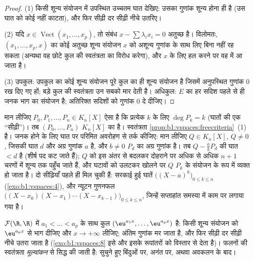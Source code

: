 \begin{proof}
(1) किसी शून्य संयोजन में उपस्थित उच्चतम घात देखिए: उसका गुणांक शून्य होना
ही है (उस घात को कोई नहीं काटता), और फिर सीढ़ी दर सीढ़ी नीचे उतरिए।

(2) यदि $x \in \operatorname{Vect}(x_1, \dots, x_p)$, तो संबंध $x -
\sum\lambda_i x_i = 0$ अतुच्छ है। विलोमतः, $(x_1, \dots, x_p, x)$ का कोई
अतुच्छ शून्य संयोजन $x$ को अशून्य गुणांक के साथ लिए बिना नहीं रह सकता
(अन्यथा वह छोटे कुल की स्वतंत्रता का विरोध करेगा), और $x$ के लिए हल करने पर
वह  में आ जाता है।

(3) उपकुल: उपकुल का कोई शून्य संयोजन पूरे कुल का ही शून्य संयोजन है जिसमें
अनुपस्थित गुणांक $0$ रख दिए गए हों; बड़े कुल की स्वतंत्रता उन सबको मार देती
है। अधिकुल: $E$ का हर सदिश पहले से ही जनक भाग का संयोजन है; अतिरिक्त सदिशों
को गुणांक $0$ दे दीजिए।
\end{proof}

\begin{example}[सीढ़ी सिद्धांत]
\label{ex:b1:vspaces:staircase}
मान लीजिए $P_0, P_1, \dots, P_n \in K_n[X]$ ऐसा है कि प्रत्येक $k$ के लिए
$\deg P_k = k$ (घातों की एक ``सीढ़ी'')। तब $(P_0, \dots, P_n)$ $K_n[X]$ का
 है। स्वतंत्रता \cref{prop:b1:vspaces:freecriteria}~(1) है। जनक होने के
लिए घात पर परिमित अवरोहण से तर्क कीजिए: मान लीजिए $Q \in K_n[X]$, $Q \neq
0$, जिसकी घात $d$ और अग्र गुणांक $a$ है, और $b \neq 0$ $P_d$ का अग्र गुणांक
है। तब $Q - \frac ab P_d$ की घात $< d$ है (शीर्ष पद कट जाते हैं); $Q$ को इस
अंतर से बदलकर दोहराने पर अधिक से अधिक $n + 1$ चरणों में शून्य  तक पहुँच
जाते हैं, और घटावों को उलटकर खोलने पर $Q$ $P_k$ के संयोजन के रूप में व्यक्त
हो जाता है। दो सीढ़ियाँ पहले ही मिल चुकी हैं: सरकाई हुई घातें
$\bigl((X-a)^k\bigr)_{0 \leq k \leq n}$ (\cref{exo:b1:vspaces:4}), और न्यूटन
गुणनफल $\bigl((X - x_0)(X - x_1)\cdots(X - x_{k-1})\bigr)_{0 \leq k \leq
n}$, जिन्हें सप्ताहांत समस्या में काम पर लगाया गया है।
\end{example}

\begin{example}\label{ex:b1:vspaces:functionfree}
$\mathcal{F}(\R,\R)$ में $a_1 < \dots < a_p$ के साथ कुल $(\eu^{a_1 x},
\dots, \eu^{a_p x})$  है: किसी शून्य संयोजन को $\eu^{a_p x}$ से भाग
दीजिए और $x \to +\infty$ लीजिए; अंतिम गुणांक मर जाता है, और फिर सीढ़ी दर
सीढ़ी नीचे उतरा जाता है (\cref{exo:b1:vspaces:8} इसे और इसके रूपांतरों को
विस्तार से देता है)। फलनों की स्वतंत्रता \emph{मूल्यांकन} से सिद्ध की जाती
है: सुचुने हुए बिंदुओं पर, अनंत पर, अथवा अवकलन के बाद।
\end{example}

